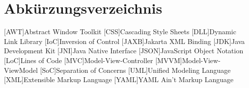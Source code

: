 \chapter*{Abkürzungsverzeichnis}
\label{abkürzungsverzeichnis}

\begin{acronym}
	[AWT]{Abstract Window Toolkit}
	[CSS]{Cascading Style Sheets}
	[DLL]{Dynamic Link Library}
	[IoC]{Inversion of Control}
	[JAXB]{Jakarta XML Binding}
	[JDK]{Java Development Kit}
	[JNI]{Java Native Interface}
	[JSON]{JavaScript Object Notation}
	[LoC]{Lines of Code}
	[MVC]{Model-View-Controller}
	[MVVM]{Model-View-ViewModel}
	[SoC]{Separation of Concerns}
	[UML]{Unified Modeling Language}
	[XML]{Extensible Markup Language}
	[YAML]{YAML Ain't Markup Language}
\end{acronym}


